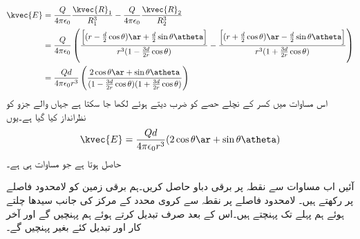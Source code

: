 \begin{align*}
\kvec{E}&=\frac{Q}{4\pi\epsilon_0} \frac{\kvec{R}_1}{R_1^3}-\frac{Q}{4\pi\epsilon_0} \frac{\kvec{R}_2}{R_2^3}\\
&=\frac{Q}{4\pi\epsilon_0}\left(\frac{\left[(r-\frac{d}{2}\cos\theta)\ar+\frac{d}{2}\sin\theta \atheta\right]}{r^3 (1-\frac{3d}{2r} \cos \theta)}-\frac{\left[(r+\frac{d}{2}\cos \theta )\ar-\frac{d}{2}\sin \theta \atheta\right]}{r^3 (1+\frac{3d}{2r} \cos \theta)} \right)\\
&=\frac{Qd }{4\pi\epsilon_0 r^3}\left( \frac{2 \cos \theta \ar+\sin \theta \atheta}{(1-\frac{3d}{2r} \cos \theta)(1+\frac{3d}{2r} \cos \theta)}\right)
\end{align*}
اس مساوات میں کسر کے نچلے حصے کو ضرب دیتے ہوئے  لکھا جا سکتا ہے جہاں  والے جزو کو نظرانداز کیا گیا ہے۔یوں
\begin{align}\label{مساوات_توانائی_جفت_قطب_دور_میدان_ب}
\kvec{E}=\frac{Qd }{4\pi\epsilon_0 r^3}( 2 \cos \theta \ar+\sin \theta \atheta)
\end{align}
حاصل ہوتا ہے جو مساوات  ہی ہے۔

آئیں اب مساوات  سے نقطہ  پر برقی دباو حاصل کریں۔ہم برقی زمین کو لامحدود فاصلے پر رکھتے ہیں۔ لامحدود فاصلے پر نقطہ   سے کروی محدد کے مرکز کی جانب سیدھا چلتے ہوئے ہم پہلے  تک پہنچتے ہیں۔اس کے بعد صرف  تبدیل کرتے ہوئے ہم  پہنچیں گے اور آخر کار  اور  تبدیل کئے بغیر  پہنچیں گے۔  

